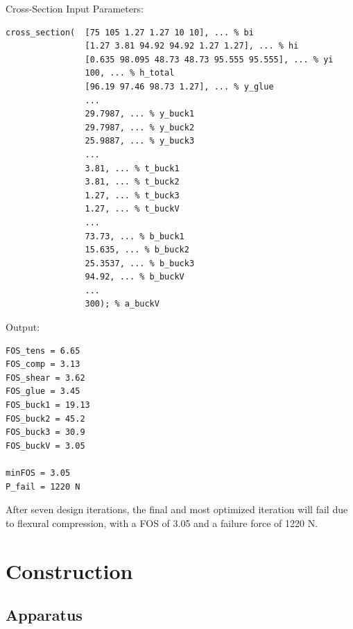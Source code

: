 \documentclass[11pt]{article}
\begin{document}
Cross-Section Input Parameters:
\begin{lstlisting}[]
cross_section(  [75 105 1.27 1.27 10 10], ... % bi
                [1.27 3.81 94.92 94.92 1.27 1.27], ... % hi
                [0.635 98.095 48.73 48.73 95.555 95.555], ... % yi
                100, ... % h_total
                [96.19 97.46 98.73 1.27], ... % y_glue
                ...
                29.7987, ... % y_buck1
                29.7987, ... % y_buck2
                25.9887, ... % y_buck3
                ...
                3.81, ... % t_buck1
                3.81, ... % t_buck2
                1.27, ... % t_buck3
                1.27, ... % t_buckV
                ...
                73.73, ... % b_buck1
                15.635, ... % b_buck2
                25.3537, ... % b_buck3
                94.92, ... % b_buckV
                ...
                300); % a_buckV
\end{lstlisting}

Output:
\begin{lstlisting}[]
FOS_tens = 6.65
FOS_comp = 3.13
FOS_shear = 3.62
FOS_glue = 3.45
FOS_buck1 = 19.13
FOS_buck2 = 45.2
FOS_buck3 = 30.9
FOS_buckV = 3.05

minFOS = 3.05
P_fail = 1220 N
\end{lstlisting}

After seven design iterations, the final and most optimized iteration will fail due to flexural compression, with a FOS of 3.05 and a failure force of 1220 N.

\clearpage
\section{Construction}

\subsection{Apparatus}
\end{document}
